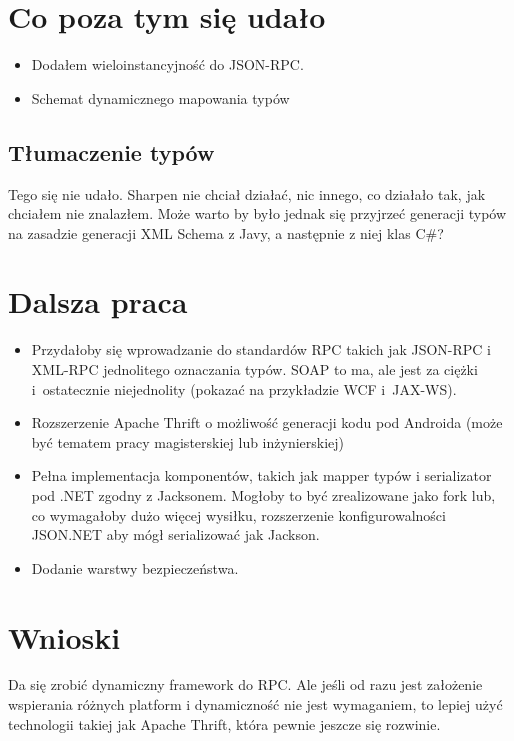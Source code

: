\section{Co poza tym się udało}
\begin{itemize}
	\item Dodałem wieloinstancyjność do JSON-RPC.
	\item Schemat dynamicznego mapowania typów
\end{itemize}


\subsection{Tłumaczenie typów}
Tego się nie udało. Sharpen nie chciał działać, nic innego, co działało tak, jak chciałem nie znalazłem. Może warto by było jednak się przyjrzeć generacji typów na zasadzie generacji XML Schema z Javy, a następnie z niej klas C\#?



\section{Dalsza praca}
\begin{itemize}
	\item Przydałoby się wprowadzanie do standardów RPC takich jak JSON-RPC i XML-RPC jednolitego oznaczania typów. SOAP to ma, ale jest za ciężki i~ostatecznie niejednolity (pokazać na przykładzie WCF i~JAX-WS).
	\item Rozszerzenie Apache Thrift o możliwość generacji kodu pod Androida (może być tematem pracy magisterskiej lub inżynierskiej)
	\item Pełna implementacja komponentów, takich jak mapper typów i serializator pod .NET zgodny z Jacksonem. Mogłoby to być zrealizowane jako fork lub, co wymagałoby dużo więcej wysiłku, rozszerzenie konfigurowalności JSON.NET aby mógł serializować jak Jackson.
	\item Dodanie warstwy bezpieczeństwa.
\end{itemize}




\section{Wnioski}
Da się zrobić dynamiczny framework do RPC. Ale jeśli od razu jest założenie wspierania różnych platform i dynamiczność nie jest wymaganiem, to lepiej użyć technologii takiej jak Apache Thrift, która pewnie jeszcze się rozwinie.